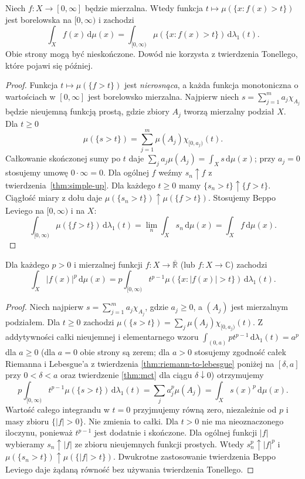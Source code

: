 \begin{twierdzenie}
\label{thm:layer-cake-8}
Niech $f:X\to[0,\infty]$ będzie mierzalna.
Wtedy funkcja $t\mapsto\mu(\{x:f(x)>t\})$
jest borelowska na $[0,\infty)$ i zachodzi
\begin{equation}\label{eq:layer-cake-8}
\int_Xf(x)\,\mathrm d\mu(x)
=\int_{[0,\infty)}\mu(\{x:f(x)>t\})\,
\mathrm d\lambda_1(t).
\end{equation}
Obie strony mogą być nieskończone. Dowód nie korzysta
z twierdzenia Tonellego, które pojawi się później.
\end{twierdzenie}
\begin{proof}
Funkcja $t\mapsto\mu(\{f>t\})$ jest \emph{nierosnąca},
a każda funkcja monotoniczna
o wartościach w $[0,\infty]$ jest borelowsko mierzalna.
Najpierw niech $s=\sum_{j=1}^m a_j\chi_{A_j}$
będzie nieujemną funkcją prostą, gdzie zbiory $A_j$
tworzą mierzalny podział $X$. Dla $t\ge0$
\[
\mu(\{s>t\})=\sum_{j=1}^m
\mu(A_j)\chi_{[0,a_j)}(t).
\]
Całkowanie skończonej sumy po $t$ daje
$\sum_ja_j\mu(A_j)=\int_Xs\,\mathrm d\mu(x)$;
przy $a_j=0$ stosujemy umowę $0\cdot\infty=0$.
Dla ogólnej $f$ weźmy $s_n\uparrow f$ z
twierdzenia~\ref{thm:simple-up}. Dla każdego $t\ge0$
mamy $\{s_n>t\}\uparrow\{f>t\}$. Ciągłość miary
z dołu daje
$\mu(\{s_n>t\})\uparrow\mu(\{f>t\})$.
Stosujemy Beppo Leviego na $[0,\infty)$ i na $X$:
\[
\int_{[0,\infty)}\mu(\{f>t\})\,
\mathrm d\lambda_1(t)
=\lim_n\int_Xs_n\,\mathrm d\mu(x)
=\int_Xf\,\mathrm d\mu(x).
\]
\end{proof}

\begin{wniosek}\label{idx:08:wniosek:20}

Dla każdego $p>0$ i mierzalnej funkcji
$f:X\to\overline{\mathbb R}$ (lub $f:X\to\mathbb C$)
zachodzi
\[
\int_X|f(x)|^p\,\mathrm d\mu(x)
=p\int_{[0,\infty)}t^{p-1}
\mu(\{x:|f(x)|>t\})\,\mathrm d\lambda_1(t).
\]
\end{wniosek}
\begin{proof}
Niech najpierw $s=\sum_{j=1}^m a_j\chi_{A_j}$,
gdzie $a_j\ge0$, a $(A_j)$ jest mierzalnym podziałem.
Dla $t\ge0$ zachodzi
$\mu(\{s>t\})=\sum_j\mu(A_j)\chi_{[0,a_j)}(t)$.
Z addytywności całki nieujemnej i elementarnego wzoru
$\int_{(0,a)}pt^{p-1}\,\mathrm d\lambda_1(t)=a^p$ dla $a\ge0$
(dla $a=0$ obie strony są zerem; dla $a>0$ stosujemy
zgodność całek Riemanna i Lebesgue'a z twierdzenia
\ref{thm:riemann-to-lebesgue} poniżej na $[\delta,a]$
przy $0<\delta<a$ oraz twierdzenie \ref{thm:mct}
dla ciągu $\delta\downarrow0$)
otrzymujemy
\[
p\int_{[0,\infty)}t^{p-1}\mu(\{s>t\})\,
\mathrm d\lambda_1(t)=\sum_j a_j^p\mu(A_j)
=\int_Xs(x)^p\,\mathrm d\mu(x).
\]
Wartość całego integrandu w $t=0$ przyjmujemy równą
zero, niezależnie od $p$ i masy zbioru $\{|f|>0\}$.
Nie zmienia to całki. Dla $t>0$ nie ma nieoznaczonego
iloczynu, ponieważ $t^{p-1}$ jest dodatnie i skończone.
Dla ogólnej funkcji $|f|$ wybieramy $s_n\uparrow|f|$
ze zbioru nieujemnych funkcji prostych.
Wtedy $s_n^p\uparrow|f|^p$ i
$\mu(\{s_n>t\})\uparrow\mu(\{|f|>t\})$.
Dwukrotne zastosowanie twierdzenia Beppo Leviego
daje żądaną równość bez używania twierdzenia Tonellego.
\end{proof}

